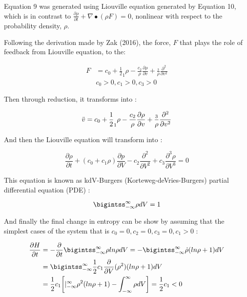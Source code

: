 \documentclass[12pt]{article}
\begin{document}
Equation 9 was generated using Liouville equation generated by Equation 10, which is in contrast to  $\frac{\partial \rho}{\partial t} + \nabla \bullet (\rho F) = 0$, nonlinear with respect to the probability density, $\rho$.

Following the derivation made by Zak (2016), the force, $F$ that plays the role of feedback from Liouville equation, to the:

\begin{align}
	F &= c_0 + \frac{1}{2}_1 \rho - \frac{c_2}{\rho} \frac{\partial \rho}{\partial v} + \frac{_3}{\rho} \frac{\partial ^2}{\partial v^2} \label{s5} \\
	& c_0 > 0, c_1 > 0, c_3 > 0 \nonumber
\end{align}

Then through reduction, it transforms into :

\begin{equation}
	\ddot{v} = c_0 + \frac{1}{2}_1 \rho - \frac{c_2}{\rho} \frac{\partial \rho}{\partial v} + \frac{_3}{\rho} \frac{\partial ^2}{\partial v^2} \label{f} \\
\end{equation}

And then the Liouville equation will transform into :

\begin{equation*}
	\frac{\partial \rho}{\partial t} + (c_0 + c_1 \rho)\frac{\partial p}{\partial V} - c_2 \frac{\partial ^2}{\partial V^2} + c_3 \frac{\partial ^3 \rho}{\partial V^3} = 0
\end{equation*}

This equation is known as kdV-Burgers (Korteweg-deVries-Burgers) partial differential equation (PDE) :

\begin{equation*}
	\bigintss_{-\infty}^{\infty} \rho dV = 1 \nonumber
\end{equation*}

And finally the final change in entropy can be show by assuming that the simplest cases of the system that is $c_0 = 0, c_2 = 0, c_3 = 0, c_1 > 0$ :

\begin{align}
	\frac{\partial H}{\partial t} &= - \frac{\partial}{\partial t} \bigintss_{-\infty}^{\infty} \rho ln \rho dV = - \bigintss_{-\infty}^{\infty} \dot{\rho} (ln \rho + 1) dV \nonumber \\
	&= \bigintss_{-\infty}^{\infty} \frac{1}{2} c_1 \frac{\partial}{\partial V} (\rho ^2) (ln \rho + 1)dV \nonumber \\
	&= \frac{1}{2} c_1 \bigg [  \rvert_{-\infty}^{\infty} \rho ^2 (ln \rho + 1) - \int_{-\infty}^{\infty} \rho dV \bigg ] = \frac{1}{2} c_1 < 0 
\end{align}
\end{document}
